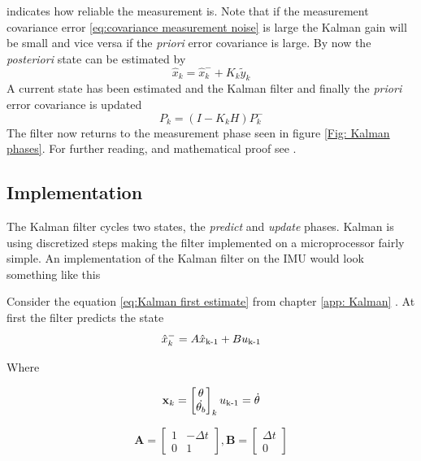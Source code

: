 \documentclass[a4paper,11pt]{kth-mag}
\begin{document}
indicates how reliable the measurement is. Note that if the measurement covariance error \eqref{eq:covariance measurement noise} is large the Kalman gain will be small and vice versa if the \textit{priori} error covariance is large.
By now the \textit{posteriori} state can be estimated by
\begin{equation}
\hat{x}_k = \hat{x}^-_k + K_k\tilde{y}_k
\end{equation}
A current state has been estimated and the Kalman filter and finally the \textit{priori} error covariance is updated
\begin{equation}
P_k=(I-K_kH)P^-_k
\end{equation} 
The filter now returns to the measurement phase seen in figure \ref{Fig: Kalman phases}.
For further reading, and mathematical proof see \cite{Kalmanintro}.


\subsection{Implementation}
\label{app: Kalman imp}
The Kalman filter cycles two states, the \textit{predict} and \textit{update} phases. Kalman is using discretized steps making the filter implemented on a microprocessor fairly simple. 
An implementation of the Kalman filter on the IMU would look something like this

Consider the equation \eqref{eq:Kalman first estimate} from chapter \ref{app: Kalman} . At first the filter predicts the state
\begin{equation}
\hat{x}^-_k = A\hat{x}\textsubscript{k-1}+Bu\textsubscript{k-1}
\end{equation}

Where

\begin{equation}
\textbf{x}_k = \begin{bmatrix}
\theta \\
\dot{\theta_b}
\end{bmatrix}_k
u\textsubscript{k-1} = \dot{\theta}
\end{equation}

\begin{equation}
\textbf{A} = \begin{bmatrix}
1  & -\Delta t \\
0   & 1
\end{bmatrix}
,
\textbf{B} = \begin{bmatrix}
\Delta t \\ 0
\end{bmatrix}
\end{equation}
\end{document}
